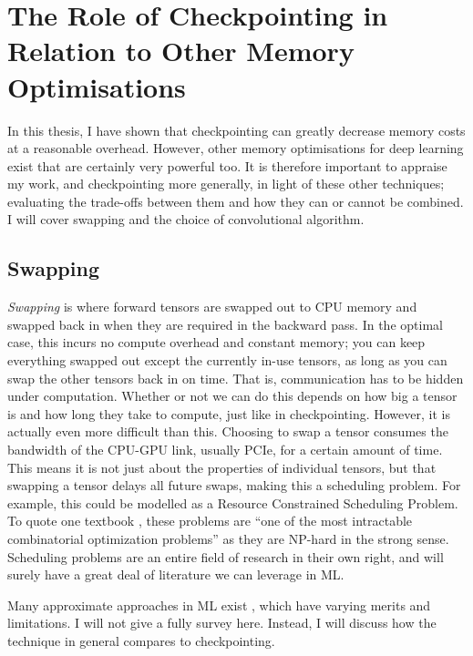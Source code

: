 \section{The Role of Checkpointing in Relation to Other Memory Optimisations}
In this thesis, I have shown that checkpointing can greatly decrease memory costs at a reasonable overhead.
However, other memory optimisations for deep learning exist that are certainly very powerful too.
It is therefore important to appraise my work, and checkpointing more generally, in light of these other techniques; evaluating the trade-offs between them and how they can or cannot be combined.
I will cover swapping and the choice of convolutional algorithm.

\subsection{Swapping}
\textit{Swapping} is where forward tensors are swapped out to CPU memory and swapped back in when they are required in the backward pass.
In the optimal case, this incurs no compute overhead and constant memory; you can keep everything swapped out except the currently in-use tensors, as long as you can swap the other tensors back in on time.
That is, communication has to be hidden under computation.
Whether or not we can do this depends on how big a tensor is and how long they take to compute, just like in checkpointing.
However, it is actually even more difficult than this.
Choosing to swap a tensor consumes the bandwidth of the CPU-GPU link, usually PCIe, for a certain amount of time.
This means it is not just about the properties of individual tensors, but that swapping a tensor delays all future swaps, making this a scheduling problem.
For example, this could be modelled as a Resource Constrained Scheduling Problem.
To quote one textbook \cite[p.~23]{Artigues2007-rcps}, these problems are ``one of the most intractable combinatorial optimization problems'' as they are NP-hard in the strong sense.
Scheduling problems are an entire field of research in their own right, and will surely have a great deal of literature we can leverage in ML.

Many approximate approaches in ML exist \cite{Zhang2019, Wang2018, Rhu2016, ShriramS2019, Li2019-mem-limited-devices, Le2018-tflms, Chen2019-modnn, Ito2017-ooc-cudnn, Aupy2016, Schanen2016, Kukreja2018, Aupy2019}, which have varying merits and limitations.
I will not give a fully survey here.
Instead, I will discuss how the technique in general compares to checkpointing.

